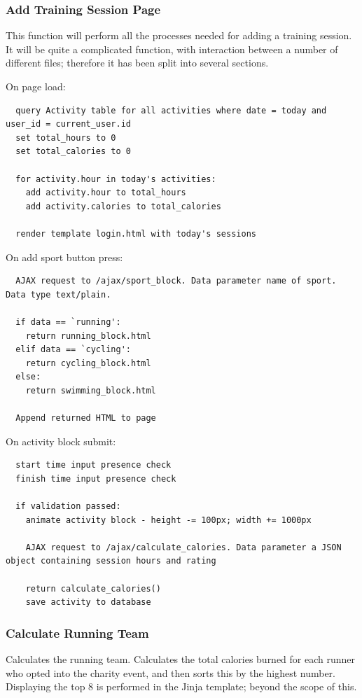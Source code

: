 \documentclass{article}[12pt,a4paper]
\begin{document}
\subsubsection{Add Training Session Page}
This function will perform all the processes needed for adding a training session. It will be quite a complicated function, with interaction between a number of different files; therefore it has been split into several sections.


On page load:
\begin{verbatim}
  query Activity table for all activities where date = today and user_id = current_user.id
  set total_hours to 0
  set total_calories to 0

  for activity.hour in today's activities:
    add activity.hour to total_hours
    add activity.calories to total_calories

  render template login.html with today's sessions
\end{verbatim}

\noindent
On add sport button press:
\begin{verbatim}
  AJAX request to /ajax/sport_block. Data parameter name of sport. Data type text/plain.

  if data == `running':
    return running_block.html
  elif data == `cycling':
    return cycling_block.html
  else:
    return swimming_block.html

  Append returned HTML to page
\end{verbatim}

\noindent
On activity block submit:
\begin{verbatim}
  start time input presence check
  finish time input presence check

  if validation passed:
    animate activity block - height -= 100px; width += 1000px

    AJAX request to /ajax/calculate_calories. Data parameter a JSON object containing session hours and rating

    return calculate_calories()
    save activity to database
\end{verbatim}

\subsubsection{Calculate Running Team}
Calculates the running team. Calculates the total calories burned for each runner who opted into the charity event, and then sorts this by the highest number. Displaying the top 8 is performed in the Jinja template; beyond the scope of this.
\end{document}

